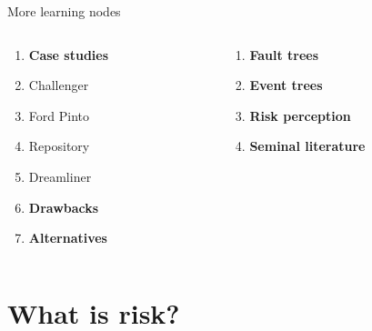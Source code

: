 \documentclass[aspectratio=1610,pdftex,dvipsnames,compress,xcolor={dvipsnames}]{beamer}
\begin{document}
\begin{frame}{More learning nodes}
    \begin{columns}[t]

        \begin{column}{0.50\textwidth}
            \begin{enumerate}[series=outerlist,topsep=0pt,itemsep=1pt,leftmargin=*,label=(\arabic*)]
                \item[]\textbf{Case studies}
                \item[]Challenger
                \item[]Ford Pinto  
                \item[]Repository
                \item[]Dreamliner
                    \vspace{0.10in}
                \item[]\textbf{Drawbacks}
                    \vspace{0.10in}
                \item[]\textbf{Alternatives}
            \end{enumerate}
        \end{column}

        \begin{column}{0.50\textwidth}
            \begin{enumerate}[series=outerlist,topsep=0pt,itemsep=1pt,leftmargin=*,label=(\arabic*)]
                \item[]\hfill\textbf{Fault trees}
                    \vspace{0.10in}
                \item[]\hfill\textbf{Event trees}
                    \vspace{0.10in}
                \item[]\hfill\textbf{Risk perception}
                    \vspace{0.10in}
                \item[]\hfill\textbf{Seminal literature}
            \end{enumerate}
        \end{column}

    \end{columns}
\end{frame}


\section{What is risk?}
\end{document}
